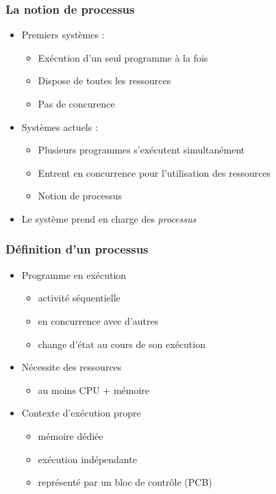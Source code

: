 \begin{frame}
\frametitle{La notion de processus}
\begin{itemize}
\item Premiers systèmes :
\begin{itemize}
\item Exécution d’un seul programme à la fois
\item Dispose de toutes les ressources
\item Pas de concurence
\end{itemize}
\item Systèmes actuels :
\begin{itemize}
\item Plusieurs programmes s’exécutent simultanément
\item Entrent en concurrence pour l’utilisation des ressources
\item Notion de processus
\end{itemize}
\item Le système prend en charge des \emph{processus}
\end{itemize}
\end{frame}

\begin{frame}
\frametitle{Définition d’un processus}
\begin{itemize}
\item Programme en exécution
\begin{itemize}
\item activité séquentielle
\item en concurrence avec d'autres
\item change d’état au cours de son exécution
\end{itemize}
\item Nécessite des ressources
\begin{itemize}
\item au moins CPU + mémoire
\end{itemize}
\item Contexte d'exécution propre
\begin{itemize}
\item mémoire dédiée
\item exécution indépendante
\item représenté par un bloc de contrôle (PCB)
\end{itemize}
\end{itemize}
\end{frame}


